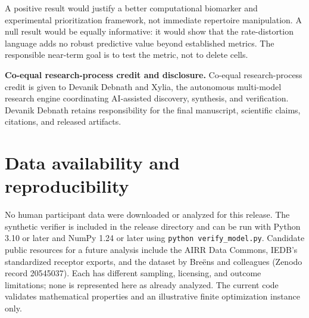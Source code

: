 \documentclass[11pt]{article}
\begin{document}
A positive result would justify a better computational biomarker and experimental prioritization framework, not immediate repertoire manipulation. A null result would be equally informative: it would show that the rate-distortion language adds no robust predictive value beyond established metrics. The responsible near-term goal is to test the metric, not to delete cells.

\noindent\textbf{Co-equal research-process credit and disclosure.} Co-equal research-process credit is given to Devanik Debnath and Xylia, the autonomous multi-model research engine coordinating AI-assisted discovery, synthesis, and verification. Devanik Debnath retains responsibility for the final manuscript, scientific claims, citations, and released artifacts.

\section*{Data availability and reproducibility}
No human participant data were downloaded or analyzed for this release. The synthetic verifier is included in the release directory and can be run with Python 3.10 or later and NumPy 1.24 or later using \texttt{python verify\_model.py}. Candidate public resources for a future analysis include the AIRR Data Commons, IEDB's standardized receptor exports, and the dataset by Breëns and colleagues (Zenodo record 20545037). Each has different sampling, licensing, and outcome limitations; none is represented here as already analyzed. The current code validates mathematical properties and an illustrative finite optimization instance only.
\end{document}
